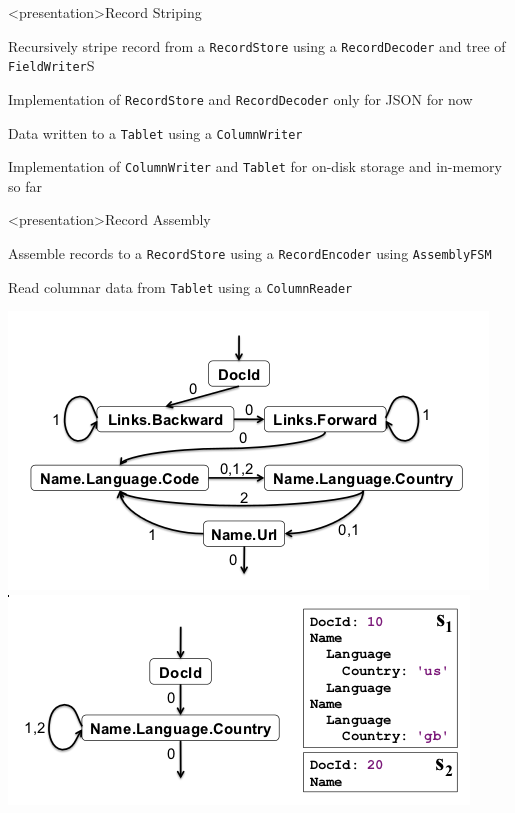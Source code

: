 \begin{frame}<presentation>{Record Striping}
\begin{niitemize}
 \item Recursively stripe record from a \texttt{RecordStore} using a
  \texttt{RecordDecoder} and tree of \texttt{FieldWriter}S
 \item Implementation of \texttt{RecordStore} and \texttt{RecordDecoder} only
  for JSON for now
 \item Data written to a \texttt{Tablet} using a \texttt{ColumnWriter}
 \item Implementation of \texttt{ColumnWriter} and \texttt{Tablet} for on-disk
  storage and in-memory so far
\end{niitemize}
\end{frame}

\begin{frame}<presentation>{Record Assembly}
\begin{niitemize}
 \item Assemble records to a \texttt{RecordStore} using a
  \texttt{RecordEncoder} using \texttt{AssemblyFSM}
 \item Read columnar data from \texttt{Tablet} using a \texttt{ColumnReader}
\end{niitemize}

\includegraphics[width=.49\textwidth]{gfx/full-assemblyfsm}
\hfill
\includegraphics[width=.49\textwidth]{gfx/partial-assemblyfsm}
\end{frame}

